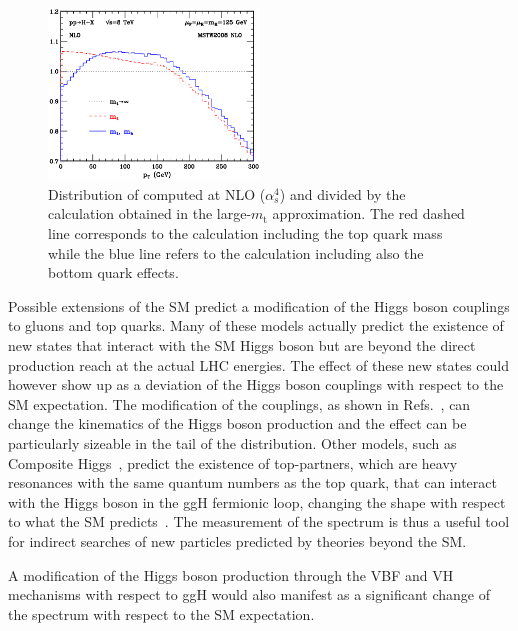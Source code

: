 \begin{figure}[htb]
\centering
\includegraphics[width=0.5\textwidth]{images/pth_quarkmass.png}
\caption{Distribution of \pth computed at NLO ($\alpha_s^4$) and divided by the calculation obtained in the large-$m_\mathrm{t}$ approximation. The red dashed line corresponds to the calculation including the top quark mass while the blue line refers to the calculation including also the bottom quark effects.}\label{fig:pth_quarkmass}
\end{figure}

Possible extensions of the SM predict a modification of the Higgs boson couplings to gluons and top quarks. Many of these models actually predict the existence of new states that interact with the SM Higgs boson but are beyond the direct production reach at the actual LHC energies. The effect of these new states could however show up as a deviation of the Higgs boson couplings with respect to the SM expectation. The modification of the couplings, as shown in Refs.~\cite{Azatov:2013xha,Harlander:2013oja}, can change the kinematics of the Higgs boson production and the effect can be particularly sizeable in the tail of the \pth distribution. 
Other models, such as Composite Higgs~\cite{Marzocca:2012zn}, predict the existence of top-partners, which are heavy resonances with the same quantum numbers as the top quark, that can interact with the Higgs boson in the ggH fermionic loop, changing the \pth shape with respect to what the SM predicts~\cite{Banfi:2013yoa}.
The measurement of the \pth spectrum is thus a useful tool for indirect searches of new particles predicted by theories beyond the SM.

A modification of the Higgs boson production through the VBF and VH mechanisms with respect to ggH would also manifest as a significant change of the \pth spectrum with respect to the SM expectation.



